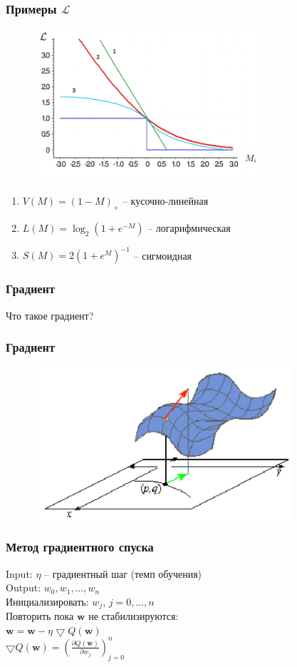 \documentclass[12pt]{beamer}
\begin{document}
\begin{frame}\frametitle{Примеры $\mathcal{L}$}
\begin{figure}[htbp]
  \includegraphics[height=160pt, keepaspectratio = true]{images/l}   
\end{figure}
\begin{enumerate}
\item $V(M) = (1-M)_+$ -- кусочно-линейная
\item $L(M) = \log_2(1+e^{-M})$ -- логарифмическая
\item $S(M) = 2(1+e^M)^{-1}$ -- сигмоидная
\end{enumerate}
\end{frame}

\begin{frame}\frametitle{Градиент}
Что такое градиент?
\end{frame}

\begin{frame}\frametitle{Градиент}
\begin{figure}[htbp]
  \includegraphics[height=160pt, keepaspectratio = true]{images/gradient}   
\end{figure}
\end{frame}

\begin{frame}\frametitle{Метод градиентного спуска}
Input: $\eta$ -- градиентный шаг (темп обучения)\\
Output: $w_0, w_1, \dots, w_n$\\
\vspace{3mm}	
Инициализировать: $w_j$, $j=0,\dots, n$\\
Повторить пока $\mathbf{w}$ не стабилизируются:\\
\hspace{10mm} $\mathbf{w} =  \mathbf{w} - \eta \bigtriangledown Q(\mathbf{w})$\\

\vspace{10mm}
$\bigtriangledown Q(\mathbf{w}) = (\frac{\partial Q(\mathbf{w})}{\partial w_j})_{j=0}^n$\\
\end{frame}
\end{document}
